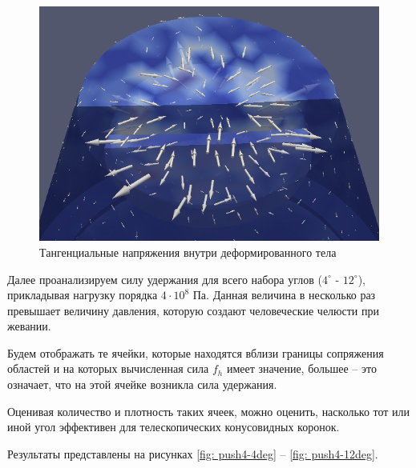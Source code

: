 \documentclass[a4paper, 14pt]{extreport}
\begin{document}
\begin{figure}[H]
	\center
	\includegraphics[scale=0.55]{pictures/result_push_shear_stress_partial.png}
	\caption{Тангенциальные напряжения  внутри деформированного тела}
	\label{fig: result_push_shear_stress_partial}
\end{figure}

Далее проанализируем силу удержания для всего набора углов 
($4^{\circ}$ - $12^{\circ}$), прикладывая нагрузку 
порядка $4\cdot10^8$ Па. Данная величина в несколько раз
превышает 
величину давления, которую создают человеческие челюсти при
жевании.

Будем отображать те ячейки, которые находятся вблизи 
границы сопряжения областей и на которых вычисленная сила
$f_h$ имеет значение, большее -- это означает, что на этой 
ячейке возникла сила удержания.

Оценивая количество и плотность таких ячеек, можно оценить,
насколько тот или иной угол эффективен для телескопических 
конусовидных коронок.

Результаты представлены на рисунках \ref{fig: push4-4deg} -- 
\ref{fig: push4-12deg}.
\end{document}
